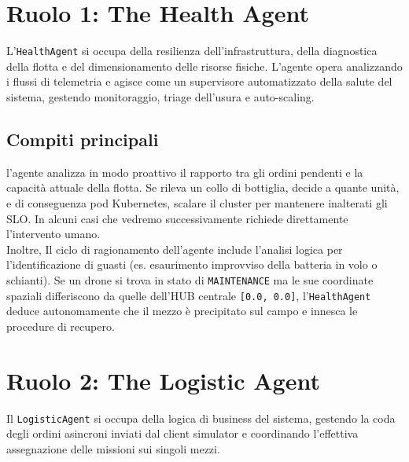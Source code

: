 \section{Ruolo 1: The Health Agent}
\label{sec:health_agent}
L'\texttt{HealthAgent} si occupa della resilienza dell'infrastruttura, della diagnostica della flotta e del dimensionamento delle risorse fisiche. L'agente opera analizzando i flussi di telemetria e agisce come un supervisore automatizzato della salute del sistema, gestendo monitoraggio, triage dell'usura e auto-scaling.


\subsection*{Compiti principali}
l'agente analizza in modo proattivo il rapporto tra gli ordini pendenti e la capacità attuale della flotta. Se rileva un collo di bottiglia, decide a quante unità, e di conseguenza pod Kubernetes, scalare il cluster per mantenere inalterati gli SLO. In alcuni casi che vedremo successivamente richiede direttamente l'intervento umano.\\
Inoltre, Il ciclo di ragionamento dell'agente include l'analisi logica per l'identificazione di guasti (es. esaurimento improvviso della batteria in volo o schianti). Se un drone si trova in stato di \texttt{MAINTENANCE} ma le sue coordinate spaziali differiscono da quelle dell'HUB centrale \texttt{[0.0, 0.0]}, l'\texttt{HealthAgent} deduce autonomamente che il mezzo è precipitato sul campo e innesca le procedure di recupero. 


\section{Ruolo 2: The Logistic Agent}
\label{sec:logistic_agent}
Il \texttt{LogisticAgent} si occupa della logica di business del sistema, gestendo la coda degli ordini asincroni inviati dal client simulator e coordinando l'effettiva assegnazione delle missioni sui singoli mezzi.

